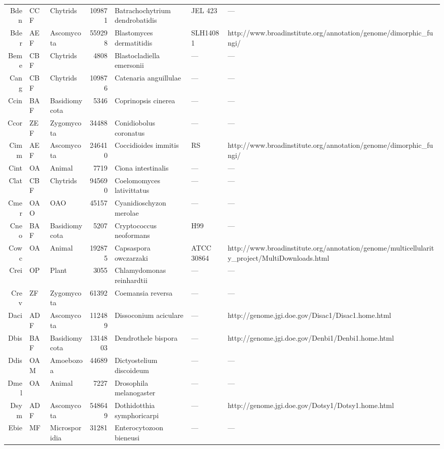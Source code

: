 {{\begin{longtable}{rllrlll}
  Bden & CCF & Chytrids & 109871 & Batrachochytrium dendrobatidis & JEL 423 & --- \\ 
  Bder & AEF & Ascomycota & 559298 & Blastomyces dermatitidis & SLH14081 & http://www.broadinstitute.org/annotation/genome/dimorphic\_fungi/ \\ 
  Beme & CBF & Chytrids & 4808 & Blastocladiella emersonii & --- & --- \\ 
  Cang & CBF & Chytrids & 109876 & Catenaria anguillulae & --- & --- \\ 
  Ccin & BAF & Basidiomycota & 5346 & Coprinopsis cinerea & --- & --- \\ 
  Ccor & ZEF & Zygomycota & 34488 & Conidiobolus coronatus & --- & --- \\ 
  Cimm & AEF & Ascomycota & 246410 & Coccidioides immitis & RS & http://www.broadinstitute.org/annotation/genome/dimorphic\_fungi/ \\ 
  Cint & OA & Animal & 7719 & Ciona intestinalis & --- & --- \\ 
  Clat & CBF & Chytrids & 945690 & Coelomomyces lativittatus & --- & --- \\ 
  Cmer & OAO & OAO & 45157 & Cyanidioschyzon merolae & --- & --- \\ 
  Cneo & BAF & Basidiomycota & 5207 & Cryptococcus neoformans & H99 & --- \\ 
  Cowc & OA & Animal & 192875 & Capsaspora owczarzaki & ATCC 30864 & http://www.broadinstitute.org/annotation/genome/multicellularity\_project/MultiDownloads.html \\ 
  Crei & OP & Plant & 3055 & Chlamydomonas reinhardtii & --- & --- \\ 
  Crev & ZF & Zygomycota & 61392 & Coemansia reversa & --- & --- \\ 
  Daci & ADF & Ascomycota & 112489 & Dissoconium aciculare & --- & http://genome.jgi.doe.gov/Disac1/Disac1.home.html \\ 
  Dbis & BAF & Basidiomycota & 1314803 & Dendrothele bispora & --- & http://genome.jgi.doe.gov/Denbi1/Denbi1.home.html \\ 
  Ddis & OAM & Amoebozoa & 44689 & Dictyostelium discoideum & --- & --- \\ 
  Dmel & OA & Animal & 7227 & Drosophila melanogaster & --- & --- \\ 
  Dsym & ADF & Ascomycota & 548649 & Dothidotthia symphoricarpi & --- & http://genome.jgi.doe.gov/Dotsy1/Dotsy1.home.html \\ 
  Ebie & MF & Microsporidia & 31281 & Enterocytozoon bieneusi & --- & --- \\ 

\end{longtable}}}
